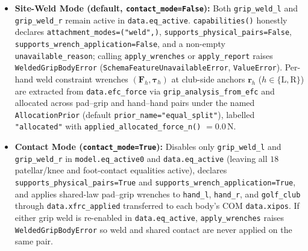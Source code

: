\documentclass[11pt,a4paper]{article}
\begin{document}
\begin{itemize}[leftmargin=*,noitemsep]
\item \textbf{Site-Weld Mode (default, \texttt{contact\_mode=False}):} Both \texttt{grip\_weld\_l} and \texttt{grip\_weld\_r} remain active in \texttt{data.eq\_active}. \texttt{capabilities()} honestly declares \texttt{attachment\_modes=("weld",)}, \texttt{supports\_physical\_pairs=False}, \texttt{supports\_wrench\_application=False}, and a non-empty \texttt{unavailable\_reason}; calling \texttt{apply\_wrenches} or \texttt{apply\_report} raises \texttt{WeldedGripBodyError} (\texttt{SchemaFeatureUnavailableError}, \texttt{ValueError}). Per-hand weld constraint wrenches $(\mathbf{F}_h, \boldsymbol{\tau}_h)$ at club-side anchors $\mathbf{r}_h$ ($h \in \{\mathrm{L}, \mathrm{R}\}$) are extracted from \texttt{data.efc\_force} via \texttt{grip\_analysis\_from\_efc} and allocated across pad--grip and hand--hand pairs under the named \texttt{AllocationPrior} (default \texttt{prior\_name="equal\_split"}), labelled \texttt{"allocated"} with \texttt{applied\_allocated\_force\_n()} $= 0.0\,\mathrm{N}$.
\item \textbf{Contact Mode (\texttt{contact\_mode=True}):} Disables only \texttt{grip\_weld\_l} and \texttt{grip\_weld\_r} in \texttt{model.eq\_active0} and \texttt{data.eq\_active} (leaving all $18$ patellar/knee and foot-contact equalities active), declares \texttt{supports\_physical\_pairs=True} and \texttt{supports\_wrench\_application=True}, and applies shared-law pad--grip wrenches to \texttt{hand\_l}, \texttt{hand\_r}, and \texttt{golf\_club} through \texttt{data.xfrc\_applied} transferred to each body's COM \texttt{data.xipos}. If either grip weld is re-enabled in \texttt{data.eq\_active}, \texttt{apply\_wrenches} raises \texttt{WeldedGripBodyError} so weld and shared contact are never applied on the same pair.
\end{itemize}
\end{document}
